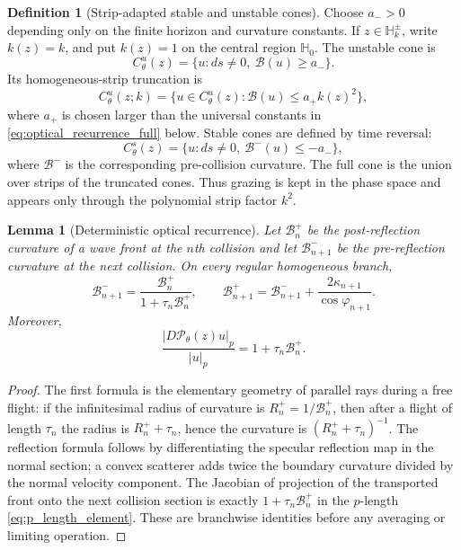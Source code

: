 \documentclass[12pt, letterpaper]{amsart}
\newcommand{\Pcal}{\mathcal{P}}
\theoremstyle{plain}
\newtheorem{lemma}[theorem]{Lemma}
\theoremstyle{definition}
\newtheorem{definition}[theorem]{Definition}
\theoremstyle{remark}
\begin{document}
\begin{definition}[Strip-adapted stable and unstable cones]
\label{def:cones_singular}
Choose $a_->0$ depending only on the finite horizon and curvature constants.  If
$z\in\mathbb H_k^\pm$, write $k(z)=k$, and put $k(z)=1$ on the central region
$\mathbb H_0$.  The unstable cone is
\begin{equation}
    C^u_\theta(z)=\{u:ds\ne0,\ \mathcal B(u)\ge a_-\}.
\end{equation}
Its homogeneous-strip truncation is
\begin{equation}
    C^u_\theta(z;k)=\{u\in C^u_\theta(z):\mathcal B(u)\le a_+ k(z)^2\},
\end{equation}
where $a_+$ is chosen larger than the universal constants in
\eqref{eq:optical_recurrence_full} below.  Stable cones are defined by time
reversal:
\begin{equation}
    C^s_\theta(z)=\{u:ds\ne0,\ \mathcal B^-(u)\le -a_-\},
\end{equation}
where $\mathcal B^-$ is the corresponding pre-collision curvature.  The full
cone is the union over strips of the truncated cones.  Thus grazing is kept in
the phase space and appears only through the polynomial strip factor $k^2$.
\end{definition}

\begin{lemma}[Deterministic optical recurrence]
\label{lem:optical_recurrence}
Let $\mathcal B_n^+$ be the post-reflection curvature of a wave front at the
$n$th collision and let $\mathcal B_{n+1}^-$ be the pre-reflection curvature at
the next collision.  On every regular homogeneous branch,
\begin{equation}
\label{eq:optical_recurrence_full}
    \mathcal B_{n+1}^-=\frac{\mathcal B_n^+}{1+\tau_n\mathcal B_n^+},
    \qquad
    \mathcal B_{n+1}^+=\mathcal B_{n+1}^-+\frac{2\kappa_{n+1}}{\cos\varphi_{n+1}} .
\end{equation}
Moreover,
\begin{equation}
\label{eq:p_expansion_exact}
    \frac{|D\Pcal_\theta(z)u|_p}{|u|_p}=1+\tau_n\mathcal B_n^+ .
\end{equation}
\end{lemma}

\begin{proof}
The first formula is the elementary geometry of parallel rays during a free
flight: if the infinitesimal radius of curvature is
$R_n^+=1/\mathcal B_n^+$, then after a flight of length $\tau_n$ the radius is
$R_n^++\tau_n$, hence the curvature is
$(R_n^++\tau_n)^{-1}$.  The reflection formula follows by differentiating the
specular reflection map in the normal section; a convex scatterer adds twice the
boundary curvature divided by the normal velocity component.  The Jacobian of
projection of the transported front onto the next collision section is exactly
$1+\tau_n\mathcal B_n^+$ in the $p$-length \eqref{eq:p_length_element}.  These
are branchwise identities before any averaging or limiting operation.
\end{proof}
\end{document}
